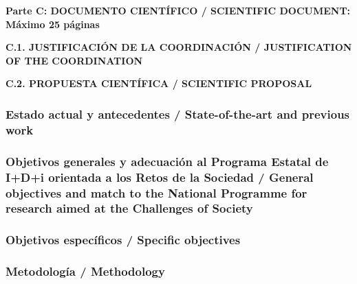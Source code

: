 \documentclass[a4paper,11pt,oneside]{article}
\begin{document}
\begin{tcolorbox}[colback=yellow,arc=0pt,outer arc=0pt,colframe=black,boxrule=0.6pt,left=0mm]
  \noindent\textbf{Parte C: DOCUMENTO CIENTÍFICO / SCIENTIFIC DOCUMENT: Máximo 25 páginas}
\end{tcolorbox}

\vspace{12pt}

\noindent\textbf{C.1. JUSTIFICACIÓN DE LA COORDINACIÓN / JUSTIFICATION OF THE COORDINATION}
\vspace{12pt}



\vspace{12pt}

\noindent\textbf{C.2. PROPUESTA CIENTÍFICA / SCIENTIFIC PROPOSAL}

\subsubsection*{\label{subsubsec:stateoftheart}Estado actual y antecedentes /  State-of-the-art and previous work}




\subsubsection*{Objetivos generales y adecuación al Programa Estatal de I+D+i orientada a los Retos de la Sociedad / General objectives and match to the National Programme for research aimed at the Challenges of Society}


%

\subsubsection*{Objetivos específicos / Specific objectives}
%

%
%
%
%

\subsubsection*{Metodolog\'ia / Methodology}
\end{document}
